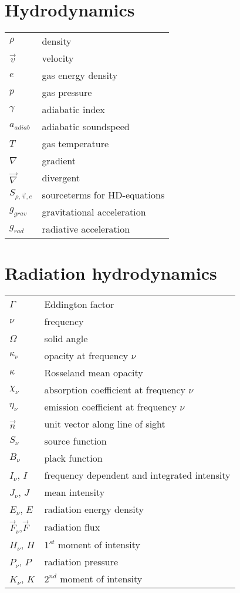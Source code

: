\begin{multicols}{2}
\section*{Hydrodynamics}
\begin{tabular}{ll}
$\rho$         & density       \\
$\vec{v}$      & velocity      \\
$e$		  	   & gas energy density   \\
$p$		  	   & gas pressure  \\
$\gamma$       & adiabatic index \\
$a_{adiab}$    & adiabatic soundspeed \\
$T$		  	   & gas temperature \\
$\nabla$       & gradient\\
$\vec{\nabla}$ & divergent\\
$S_{\rho, \vec{v}, e}$ & sourceterms for HD-equations\\
$g_{grav}$     & gravitational acceleration \\
$g_{rad}$	   & radiative acceleration \\
\end{tabular}


\section*{Radiation hydrodynamics}
\begin{tabular}{ll}
$\Gamma$      & Eddington factor \\
$\nu$         & frequency \\
$\Omega$      & solid angle \\
$\kappa_\nu$  & opacity at frequency $\nu$ \\
$\kappa$      & Rosseland mean opacity\\
$\chi_\nu$    & absorption coefficient at frequency $\nu$ \\
$\eta_\nu$    & emission coefficient at frequency $\nu$ \\
$\vec{n}$     & unit vector along line of sight\\
$S_\nu$       & source function\\
$B_\nu$       & plack function\\
$I_\nu$, $I$  & frequency dependent and integrated intensity\\
$J_\nu$, $J$  & mean intensity\\
$E_\nu$, $E$  & radiation energy density\\
$\vec{F}_\nu$,$\vec{F}$ & radiation flux\\
$H_\nu$, $H$  & $1^{st}$ moment of intensity\\
$P_\nu$, $P$  & radiation pressure\\
$K_\nu$, $K$  & $2^{nd}$ moment of intensity \\
\end{tabular}


\end{multicols}
